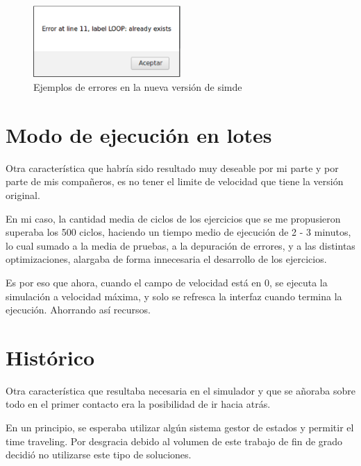 \begin{figure}[!th]
\begin{center}
\includegraphics[width=0.5\textwidth]{images/cap6/nuevoerrorsimde.eps}
\caption{Ejemplos de errores en la nueva versión de simde}
\end{center}
\end{figure}

\section{Modo de ejecución en lotes}
\label{6:sec2}

Otra característica que habría sido resultado muy deseable por mi parte y por parte de mis compañeros, 
es no tener el limite de velocidad que tiene la versión original.

En mi caso, la cantidad media de ciclos de los ejercicios que se me propusieron superaba los 500 ciclos,
 haciendo un tiempo medio de ejecución de 2 - 3 minutos, lo cual sumado a 
la media de pruebas, a la depuración de errores, y a las distintas optimizaciones, 
alargaba de forma innecesaria el desarrollo de los ejercicios.

Es por eso que ahora, cuando el campo de velocidad está en 0, se ejecuta la simulación a velocidad 
máxima, y solo se refresca la interfaz cuando termina la ejecución. Ahorrando así 
recursos. 

\section{Histórico}
\label{6:sec3}

Otra característica que resultaba necesaria en el simulador y que se añoraba sobre todo en el primer
contacto era la posibilidad de ir hacia atrás.

\bigskip
En un principio, se esperaba utilizar algún sistema gestor de estados y permitir el time traveling. 
Por desgracia debido al volumen de este trabajo de fin de grado decidió no utilizarse este tipo de 
soluciones.

